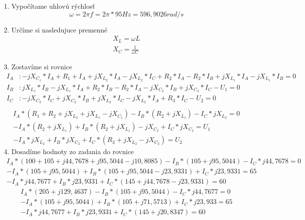 \documentclass[a4paper,12pt]{article}
\begin{document}
1. Vypočítame uhlovú rýchlosť
\begin {equation*}
	\omega = 2\pi f = 2\pi * 95Hz = 596,9026 rad/s
\end {equation*}

2. Určíme si nasledujuce premenné
\begin{equation*}
    \begin{split}
	X_L = \omega L \\
	X_C = \frac{1}{\omega C}
   \end{split}
\end{equation*}

 3. Zostavíme  si rovnice
\begin{equation*}
    \begin{split}
	I_A &: -jX_{C_1}*I_A + R_1+I_A + jX_{L_2}*I_A - jX_{L_2}*I_C+ R_2*I_A - R_2 *I_B+jX_{L_1}*I_A-jX_{L_1}*I_B = 0 \\
	I_B &: jX_{L_1}*I_B - jX_{L_1}*I_A + R_2 *I_B - R_2*I_A - jX_{C_2}*I_B + jX_{C_2}*I_C - U_1 = 0 \\
	I_C &: -jX_{C_2}*I_C + jX_{C_2}*I_B + jX_{L_2} * I_C - jX_{L_2}*I_A + R_3 * I_C - U_2 = 0 \\
   \end{split}
\end{equation*}
\hrulefill
\begin{equation*}
    \begin{split}
	I_A*(R_1+R_2+jX_{L_2}+jX_{L_1}-jX_{C_1})-I_B*(R_2+jX_{L_1}) - I_C*jX_{L_2} = 0 \\
	-I_A*(R_2+jX_{L_1})+I_B*(R_2+jX_{L_1})-jX_{C_2}+I_C*jX_{C_2}=U_1 \\
	-I_A*jX_{L_2}+I_B*jX_{C_2}+I_C*(R_3+jX_{L_2}-jX_{C_2})=U_2
   \end{split}
\end{equation*}
4. Dosadíme hodnoty zo zadania do rovnice
\begin{equation*}
    \begin{split}
	I_A*(100+105+j44,7678+j95,5044-j10,8085)-I_B*(105+j95,5044) - I_C*j44,7678 = 0 \\
	-I_A*(105+j95,5044)+I_B*(105+j95,5044-j23,9331)+I_C*j23,9331=65 \\
	-I_A*j44,7677+I_B*j23,9331+I_C*(145+j44,7678-j23,9331)=60
   \end{split}
\end{equation*}
\hrulefill
\begin{equation*}
    \begin{split}
	I_A*(205+j129,4637)-I_B*(105+j95,5044) - I_C*j44,7677 = 0 \\
	-I_A*(105+j95,5044)+I_B*(105+j71,5713)+I_C*j23,933=65\\
	-I_A*j44,7677+I_B*j23,9331+I_C*(145+j20,8347)=60
   \end{split}
\end{equation*}
\end{document}
